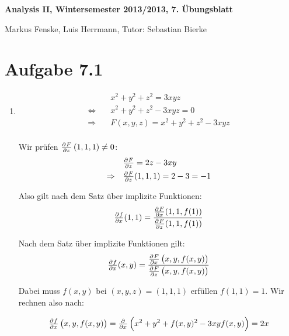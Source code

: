\documentclass[a4paper,german,12pt,smallheadings]{scrartcl}
\begin{document}
\begin{center}
\bfseries %
\sffamily %
\vspace{-40pt}
Analysis II, Wintersemester 2013/2013, 7. Übungsblatt

Markus Fenske, Luis Herrmann, Tutor: Sebastian Bierke
\vspace{-10pt}
\end{center}
\allowdisplaybreaks %
\section*{Aufgabe 7.1}
\begin{enumerate}[(1)]
  \item
    \begin{align*}
                            &x^2 + y^2 + z^2 = 3xyz \\
      \Leftrightarrow\quad  &x^2 + y^2 + z^2 - 3xyz = 0 \\
      \Rightarrow\quad      &F(x,y,z) = x^2 + y^2 + z^2 - 3xyz \\
    \end{align*}

    Wir prüfen $\pd{F}{z}\del{1,1,1} \neq 0$:
    \begin{align*}
                          &\pd{F}{z} = 2z - 3xy \\
      \Rightarrow\quad    &\pd{F}{z}(1,1,1) = 2-3 = -1
    \end{align*}

    Also gilt nach dem Satz über implizite Funktionen:
    \begin{align*}
      \pd{f}{x}(1,1) = \frac{\pd{F}{x}(1,1,f(1))}{\pd{F}{z}(1,1,f(1))}
    \end{align*}

    Nach dem Satz über implizite Funktionen gilt:
    \begin{align*}
      \pd{f}{x}(x,y) = \frac{\pd{F}{x}\del{x,y,f(x,y)}}{\pd{F}{z}\del{x,y,f(x,y)}}
    \end{align*}

    Dabei muss $f(x,y)$ bei $(x,y,z) = (1,1,1)$ erfüllen $f(1,1) = 1$. Wir rechnen also nach:

    \begin{align*}
      \pd{f}{x}\del{x,y,f(x,y)} = \pd{}{x} \del{x^2 + y^2 + f(x,y)^2 - 3xyf(x,y)} = 2x
    \end{align*}


\end{enumerate}
\end{document}
